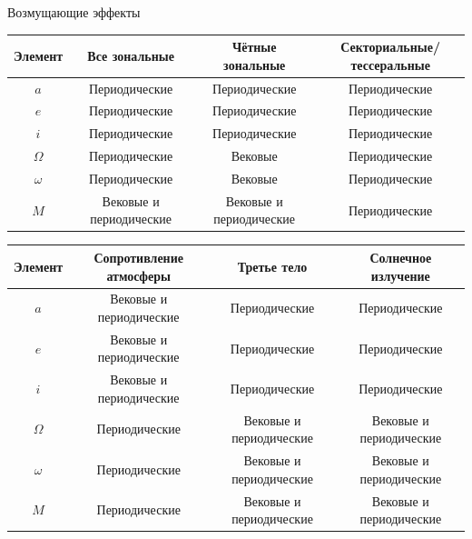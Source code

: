 \documentclass[8pt]{beamer}
\begin{document}
\begin{frame}{Возмущающие эффекты}
\begin{table}[h]
\centering
\small

\begin{tabular}{cccc}
\toprule
\textbf{Элемент} &
\textbf{Все зональные} &
\textbf{Чётные зональные} &
\textbf{Секториальные/тессеральные} \\
\midrule
$a$        & Периодические          & Периодические          & Периодические          \\
$e$        & Периодические          & Периодические          & Периодические          \\
$i$        & Периодические          & Периодические          & Периодические          \\
$\Omega$   & Периодические          & Вековые                & Периодические          \\
$\omega$   & Периодические          & Вековые                & Периодические          \\
$M$        & Вековые и периодические & Вековые и периодические & Периодические        \\
\bottomrule
\end{tabular}

\vspace{0.6em}

\begin{tabular}{cccc}
\toprule
\textbf{Элемент} &
\textbf{Сопротивление атмосферы} &
\textbf{Третье тело} &
\textbf{Солнечное излучение} \\
\midrule
$a$        & Вековые и периодические & Периодические          & Периодические          \\
$e$        & Вековые и периодические & Периодические          & Периодические          \\
$i$        & Вековые и периодические & Периодические          & Периодические          \\
$\Omega$   & Периодические           & Вековые и периодические & Вековые и периодические \\
$\omega$   & Периодические           & Вековые и периодические & Вековые и периодические \\
$M$        & Периодические           & Вековые и периодические & Вековые и периодические \\
\bottomrule
\end{tabular}

\end{table}
\end{frame}
\end{document}
